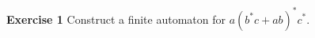 \documentclass{article}
\begin{document}
\textbf{Exercise 1} Construct a finite automaton for $a(b^*c+ab)^*c^*$. 
\end{document}
